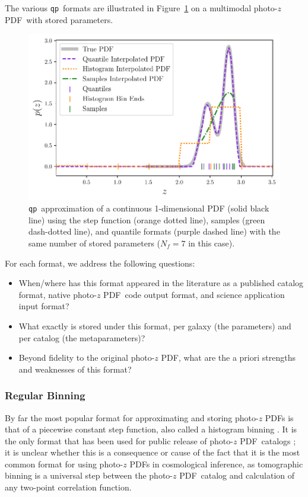 \documentclass[\docopts]{\docclass}
\newcommand{\qp}{\texttt{qp}}
\newcommand{\pz}{photo-$z$ PDF}
\begin{document}
The various \qp\ formats are illustrated in Figure~\ref{fig:qp} on a multimodal 
\pz\ with stored parameters.
\begin{figure}
  \begin{center}
    \includegraphics[width=\columnwidth]{figures/demo_pz.pdf}
    \caption{\qp\ approximation of a continuous 1-dimensional PDF (solid black 
line) using the step function (orange dotted line), samples (green dash-dotted 
line), and quantile formats (purple dashed line) with the same number of stored 
parameters ($N_{f}=7$ in this case).
    \label{fig:qp}}
  \end{center}
\end{figure}

For each format, we address the following questions:
\begin{itemize}
  \item When/where has this format appeared in the literature as a published 
catalog format, native \pz\ code output format, and science application input 
format?
  \item What exactly is stored under this format, per galaxy (the parameters) 
and per catalog (the metaparameters)?
  \item Beyond fidelity to the original \pz, what are the a priori strengths 
and weaknesses of this format?
\end{itemize}

\subsubsection{Regular Binning}
\label{sec:bins}

By far the most popular format for approximating and storing \pz s is that of a 
piecewise constant step function, also called a histogram binning 
\citep{carrasco_kind_somz:_2014, sadeh_annz2:_2016, cavuoti_metaphor:_2017}.
It is the only format that has been used for public release of \pz\ catalogs 
\citep{tanaka_photometric_2017, sheldon_photometric_2012}; it is unclear 
whether this is a consequence or cause of the fact that it is the most common 
format for using \pz s in cosmological inference, as tomographic binning is a 
universal step between the \pz\ catalog and calculation of any two-point 
correlation function.
\end{document}
